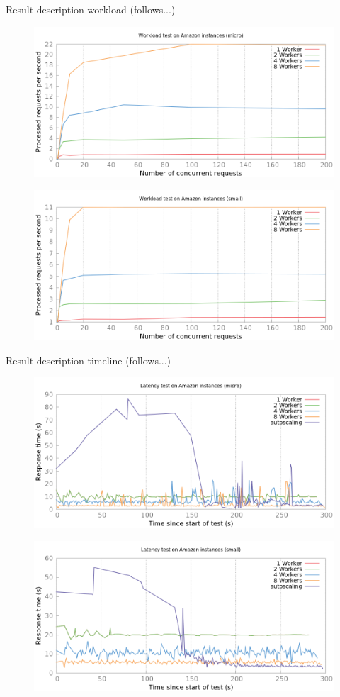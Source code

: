 \documentclass[paper=a4, fontsize=11pt]{scrartcl} %
\numberwithin{equation}{section} %
\numberwithin{figure}{section} %
\numberwithin{table}{section} %
\begin{document}
Result description workload (follows...)

\begin{figure}[h!]
\includegraphics[width=\columnwidth]{../plot/workload.png}
\end{figure}

\begin{figure}[h!]
\includegraphics[width=\columnwidth]{../plot/workload_small.png}
\end{figure}

Result description timeline (follows...)

\begin{figure}[h!]
\includegraphics[width=\columnwidth]{../plot/timeline.png}
\end{figure}

\begin{figure}[h!]
\includegraphics[width=\columnwidth]{../plot/timeline_small.png}
\end{figure}
\end{document}
